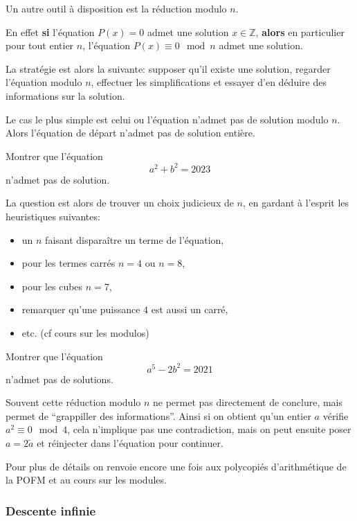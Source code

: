 Un autre outil à disposition est la réduction modulo $n$.

En effet \textbf{si} l'équation $P(x)=0$ admet une solution $x \in \mathbb{Z}$, \textbf{alors} en particulier pour tout entier $n$, l'équation $P(x) \equiv 0 \mod n$ admet une solution.

La stratégie est alors la suivante: supposer qu'il existe une solution, regarder l'équation modulo $n$, effectuer les simplifications et essayer d'en déduire des informations sur la solution.

Le cas le plus simple est celui ou l'équation n'admet pas de solution modulo $n$. Alors l'équation de départ n'admet pas de solution entière.

\begin{exo}
  Montrer que l'équation
  \[a^2 + b^2 = 2023\]
  n'admet pas de solution.
\end{exo}

La question est alors de trouver un choix judicieux de $n$, en gardant à l'esprit les heuristiques suivantes:
\begin{itemize}
  \item un $n$ faisant disparaître un terme de l'équation,
  \item pour les termes carrés $n=4$ ou $n=8$,
  \item pour les cubes $n=7$,
  \item remarquer qu'une puissance $4$ est aussi un carré,
  \item etc. (cf cours sur les modulos)
\end{itemize}

\begin{exo}
  Montrer que l'équation
  \[a^{5} - 2 b^2 = 2021\]
  n'admet pas de solutions.
\end{exo}


Souvent cette réduction modulo $n$ ne permet pas directement de conclure, mais permet de ``grappiller des informations''. Ainsi si on obtient qu'un entier $a$ vérifie $a^2 \equiv 0 \mod 4$, cela n'implique pas une contradiction, mais on peut ensuite poser $a = 2 \widetilde{a}$ et réinjecter dans l'équation pour continuer.

Pour plus de détails on renvoie encore une fois aux polycopiés d'arithmétique de la POFM et au cours sur les modules.


\subsubsection{Descente infinie}

